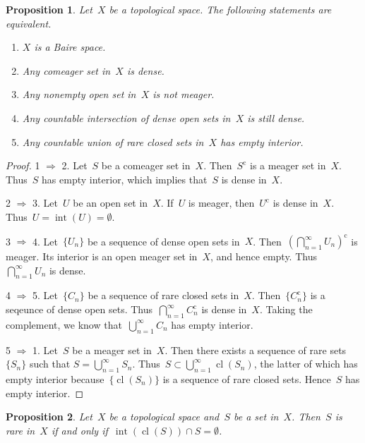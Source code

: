 \documentclass[11pt,a4paper]{article}  %
\newtheorem{proposition}{Proposition}[section]
\theoremstyle{definition}
\newcommand{\co}{{\mathrm{c}}}
\DeclareMathOperator{\inter}{int}
\DeclareMathOperator{\cl}{cl}
\numberwithin{equation}{section}
\begin{document}
\begin{proposition}
   Let~$X$ be a topological space. The following statements are equivalent.
  \begin{enumerate}
    \item $X$ is a Baire space.
    \item Any comeager set in~$X$ is dense.
    \item Any nonempty open set in~$X$ is not meager.
    \item Any countable intersection of dense open sets in~$X$ is still dense.
    \item Any countable union of rare closed sets in~$X$ has empty interior.
\end{enumerate}
\end{proposition}

\begin{proof}
  1 $\Rightarrow$ 2.
  Let~$S$ be a comeager set in~$X$. Then~$S^\co$ is a meager
  set in~$X$. Thus~$S$ has empty interior, which implies that~$S$ is dense in~$X$.

  2 $\Rightarrow$ 3.
  Let~$U$ be an open set in~$X$.
  If~$U$ is meager, then~$U^\co$ is dense in~$X$. Thus~$U=\!\inter(U) \!= \emptyset$.

  3 $\Rightarrow$ 4.
  Let~$\{U_n\}$ be a sequence of dense open sets in~$X$. Then~$(\bigcap_{n=1}^\infty U_n)^\co$ is
  meager. Its interior is an open meager set in~$X$, and hence empty. Thus~$\bigcap_{n=1}^\infty
  U_n$  is dense.

  4 $\Rightarrow$ 5.
  Let~$\{C_n\}$ be a sequence of rare closed sets in~$X$. Then~$\{C_n^\co\}$ is a seqeunce
  of dense open sets. Thus~$\bigcap_{n=1}^\infty C_n^\co$ is dense in~$X$. Taking the complement, we
  know that~$\bigcup_{n=1}^\infty C_n$ has empty interior.

  5 $\Rightarrow$ 1.
  Let~$S$ be a meager set in~$X$. Then there exists a sequence of rare sets~$\{S_n\}$ such that
  $S=\bigcup_{n=1}^\infty S_n$. Thus~$S\subset \bigcup_{n=1}^\infty \cl(S_n)$, the latter of which has
  empty interior because~$\{\cl(S_n)\}$ is a sequence of rare closed sets.
  Hence~$S$ has empty interior.
\end{proof}

\begin{proposition}
  \label{prop:intclr}
  Let~$X$ be a topological space and~$S$ be a set in~$X$. Then~$S$ is rare in~$X$ if and only
  if~$\inter(\cl(S)) \cap S = \emptyset$.
\end{proposition}
\end{document}
